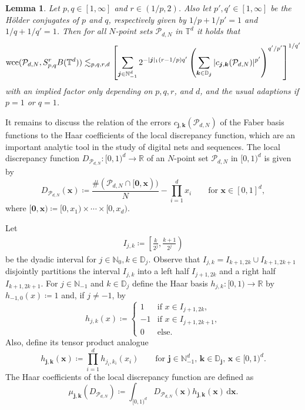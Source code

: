 \documentclass[12pt, a4paper]{article}
\newtheorem{lem}[thm]{Lemma}
\newcommand{\wce}{{\rm wce}}
\newcommand{\fritz}[1]{\begingroup\color{blue}#1\endgroup}
\newcommand{\bsx}{{\boldsymbol{x}}}
\newcommand{\bsj}{{\boldsymbol{j}}}
\newcommand{\bsk}{{\boldsymbol{k}}}
\newcommand{\calP}{{\mathcal{P}}}
\newcommand{\bbR}{{\mathbb{R}}}
\newcommand{\bbT}{{\mathbb{T}}}
\newcommand{\bbN}{{\mathbb{N}}}
\newcommand{\bbD}{{\mathbb{D}}}
\begin{document}
\begin{lem}\label{est:err:net}
Let $p, q \in [1,\infty]$ and $r \in (1/p ,2)$. Also let $p', q' \in [1,\infty]$ be the H\"older conjugates of $p$ and $q$, respectively given by $1/p+1/p'=1$ and $1/q+1/q'=1$. Then for all $N$-point sets $\calP_{d, N}$ in $\bbT^d$ it holds that
    \begin{align*} 
        \wce(\calP_{d, N}, S_{p, q}^rB(\mathbb T^d)) \lesssim_{p,q,r,d} \left[\sum_{\bsj \in \bbN_{-1}^d} 2^{-|\bsj|_1 (r-1/p) q'} \left(\sum_{\bsk \in \bbD_\bsj} |c_{\bsj, \bsk}(\calP_{d, N})|^{p'}\right)^{q'/p'}\right]^{1/q'}
    \end{align*}
    with an implied factor only depending on $p, q, r$, and $d$, and the usual adaptions if $p=1$ or $q=1$.
\end{lem}

It remains to discuss the relation of the errors $c_{\bsj, \bsk}(\calP_{d, N})$ of the Faber basis functions to the Haar coefficients of the local discrepancy function, which are an important analytic tool in the study of digital nets and sequences. The local discrepancy function $D_{\calP_{d, N}}: [0, 1)^d \rightarrow \bbR$ of an $N$-point set $\calP_{d, N}$ in $[0, 1)^d$ is given by
$$
D_{\calP_{d, N}}(\bsx) \coloneqq \frac{\#(\calP_{d, N} \cap [\mathbf 0, \bsx))}{N}  - \prod_{i=1}^d x_i \qquad \mbox{for } \bsx \in [0,1]^d,
$$ 
where $[\mathbf 0, \bsx) \coloneqq [0, x_1)\times \cdots \times [0,x_d)$.

Let
\begin{align} \label{eq:Ijk}
    I_{j, k} \coloneqq \left[\frac{k}{2^j}, \frac{k+1}{2^j}\right)
\end{align}
be the dyadic interval for $j \in \bbN_0, k \in \bbD_j$. Observe that $I_{j, k} = I_{k+1, 2k} \cup I_{k+1, 2k+1}$ disjointly partitions the interval $I_{j, k}$ into a left half $I_{j+1, 2k}$ and a right half $I_{k+1, 2k+1}$. For $j \in \bbN_{-1}$ and $k \in \bbD_j$ define the {Haar basis} $h_{j, k}: [0, 1) \rightarrow \bbR$ by $h_{-1, 0}(x) \coloneqq 1$ and, if $j \not= -1$, by
$$
h_{j, k}(x) \coloneqq \left\{\begin{array}{rl}
    1 & \mbox{if } x \in I_{j+1, 2k}, \\
    -1 & \mbox{if } x \in I_{j+1, 2k+1}, \\
    0 & \mbox{else}.
\end{array}
\right.
$$
Also, define its tensor product analogue
$$
h_{\bsj, \bsk}(\bsx) \coloneqq \prod_{i=1}^d h_{j_i, k_i}(x_i)\qquad \mbox{for } \bsj \in \bbN_{-1}^d,\, \bsk \in \bbD_\bsj,\, \bsx \in [0, 1)^d.
$$
The Haar coefficients of the local discrepancy function are defined as 
$$
\mu_{\bsj, \bsk}(D_{\calP_{d, N}}) \coloneqq \int_{[0, 1)^d} D_{\calP_{d, N}}(\bsx) h_{\bsj, \bsk}(\bsx) \, \mathrm d\bsx.
$$
\end{document}

